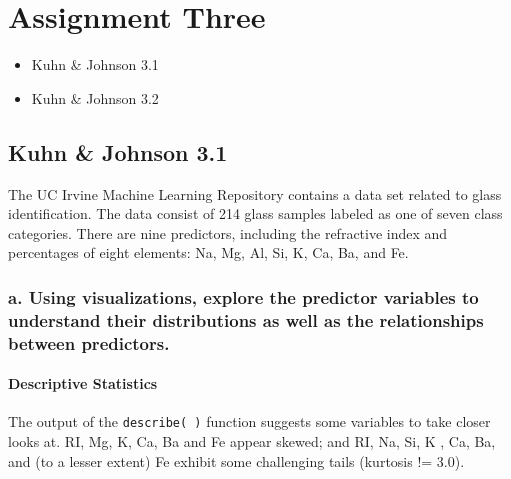 \documentclass[openany]{book}
\providecommand{\tightlist}{%
  \setlength{\itemsep}{0pt}\setlength{\parskip}{0pt}}
\renewenvironment{quote}{\begin{myquote}}{\end{myquote}}
\begin{document}
\hypertarget{assignment-three}{%
\chapter{Assignment Three}\label{assignment-three}}

\begin{itemize}
\tightlist
\item
  Kuhn \& Johnson 3.1\\
\item
  Kuhn \& Johnson 3.2
\end{itemize}

\hypertarget{kuhn-johnson-3.1}{%
\section{Kuhn \& Johnson 3.1}\label{kuhn-johnson-3.1}}

\begin{quote}
The UC Irvine Machine Learning Repository contains a data set related to glass identification. The data consist of 214 glass samples labeled as one of seven class categories. There are nine predictors, including the refractive index and percentages of eight elements: Na, Mg, Al, Si, K, Ca, Ba, and Fe.
\end{quote}

\hypertarget{a.-using-visualizations-explore-the-predictor-variables-to-understand-their-distributions-as-well-as-the-relationships-between-predictors.}{%
\subsection{a. Using visualizations, explore the predictor variables to understand their distributions as well as the relationships between predictors.}\label{a.-using-visualizations-explore-the-predictor-variables-to-understand-their-distributions-as-well-as-the-relationships-between-predictors.}}

\hypertarget{descriptive-statistics}{%
\subsubsection{Descriptive Statistics}\label{descriptive-statistics}}

The output of the \texttt{describe(\ )} function suggests some variables to take closer looks at. RI, Mg, K, Ca, Ba and Fe appear skewed; and RI, Na, Si, K , Ca, Ba, and (to a lesser extent) Fe exhibit some challenging tails (kurtosis != 3.0).
\end{document}
